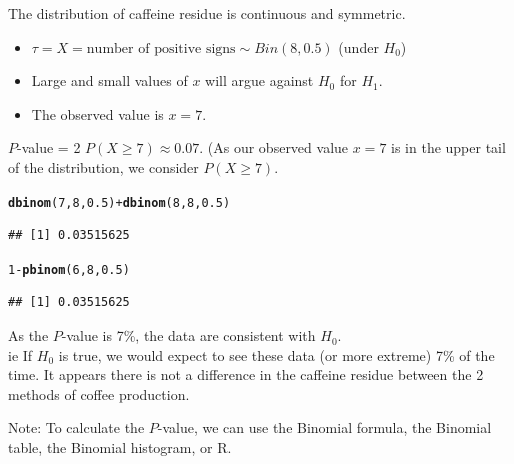 \documentclass[t,xcolor=pdftex,dvipsnames,table]{beamer}\usepackage[]{graphicx}\usepackage[]{color}
\makeatletter
\newcommand{\hlnum}[1]{\textcolor[rgb]{0.686,0.059,0.569}{#1}}%
\newcommand{\hlopt}[1]{\textcolor[rgb]{0,0,0}{#1}}%
\newcommand{\hlstd}[1]{\textcolor[rgb]{0.345,0.345,0.345}{#1}}%
\newcommand{\hlkwd}[1]{\textcolor[rgb]{0.737,0.353,0.396}{\textbf{#1}}}%
\newenvironment{kframe}{%
 \def\at@end@of@kframe{}%
 \ifinner\ifhmode%
  \def\at@end@of@kframe{\end{minipage}}%
  \begin{minipage}{\columnwidth}%
 \fi\fi%
 \def\FrameCommand##1{\hskip\@totalleftmargin \hskip-\fboxsep
 \colorbox{shadecolor}{##1}\hskip-\fboxsep
     \hskip-\linewidth \hskip-\@totalleftmargin \hskip\columnwidth}%
 \MakeFramed {\advance\hsize-\width
   \@totalleftmargin\z@ \linewidth\hsize
   \@setminipage}}%
 {\par\unskip\endMakeFramed%
 \at@end@of@kframe}
\newenvironment{knitrout}{}{} %
\makeatother
\begin{document}
\begin{frame}[fragile]{}
 The distribution of caffeine residue is continuous and symmetric.

\vspace{.5cm}
\begin{itemize}
\item $\tau = X =  \mbox{number of positive signs} \sim Bin(8,0.5)$ (under $H_{0}$) 
\item Large and small values of $x$ will argue against $H_{0}$ for $H_{1}$. \\
\item The observed value is $x=7$. 
\end{itemize}

 $P$-value = 2 $P( X \geq 7) \approx 0.07$.
(As our observed value $x=7$ is in the upper tail of the distribution, we consider $P( X \geq 7)$.

\begin{knitrout}
\color{fgcolor}\begin{kframe}
\begin{alltt}
\hlkwd{dbinom}\hlstd{(}\hlnum{7}\hlstd{,}\hlnum{8}\hlstd{,}\hlnum{0.5}\hlstd{)} \hlopt{+} \hlkwd{dbinom}\hlstd{(}\hlnum{8}\hlstd{,}\hlnum{8}\hlstd{,}\hlnum{0.5}\hlstd{)}
\end{alltt}
\begin{verbatim}
## [1] 0.03515625
\end{verbatim}
\begin{alltt}
\hlnum{1}\hlopt{-}\hlkwd{pbinom}\hlstd{(}\hlnum{6}\hlstd{,}\hlnum{8}\hlstd{,}\hlnum{0.5}\hlstd{)}
\end{alltt}
\begin{verbatim}
## [1] 0.03515625
\end{verbatim}
\end{kframe}
\end{knitrout}

\end{frame}

\begin{frame}{}

 As the $P$-value is 7\%, the data are consistent with $H_{0}$. \\
ie If $H_{0}$ is true, we would expect to see these data (or more extreme) 7\% of the time. It appears there is not a difference in the caffeine residue between the 2 methods of coffee production.

\vspace{1cm}
Note: To calculate the $P$-value, we can use the Binomial formula, the Binomial table, the Binomial histogram, or R.

\end{frame}
\end{document}
